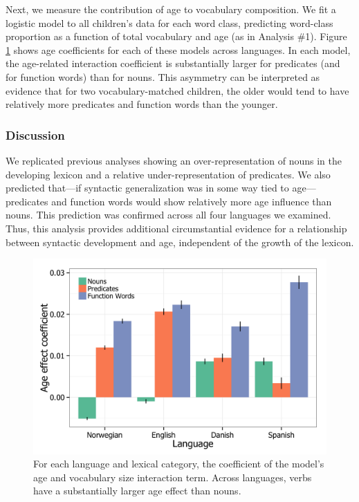 \documentclass[10pt,letterpaper]{article}
\begin{document}
Next, we measure the contribution of age to vocabulary composition. We fit a logistic model to all children's data for each word class, predicting word-class proportion as a function of total vocabulary and age (as in Analysis \#1). Figure \ref{fig:coefs_noun_verb} shows age coefficients for each of these models across languages. In each model, the age-related interaction coefficient is substantially larger for predicates (and for function words) than for nouns. This asymmetry can be interpreted as evidence that for two vocabulary-matched children, the older would tend to have relatively more predicates and function words than the younger.

\subsubsection{Discussion}

We replicated previous analyses \cite{bates1994} showing an over-representation of nouns in the developing lexicon and a relative under-representation of predicates. We also predicted that---if syntactic generalization was in some way tied to age---predicates and function words would show relatively more age influence than nouns. This prediction was confirmed across all four languages we examined. Thus, this analysis provides additional circumstantial evidence for a relationship between syntactic development and age, independent of the growth of the lexicon.

\begin{figure}
\centering
\includegraphics[width=\linewidth]{plots/coefs_vocab_comp.png}
\caption{\label{fig:coefs_noun_verb} For each language and lexical category, the coefficient of the model's age and vocabulary size interaction term. Across languages, verbs have a substantially larger age effect than nouns.}
\end{figure}
\end{document}
